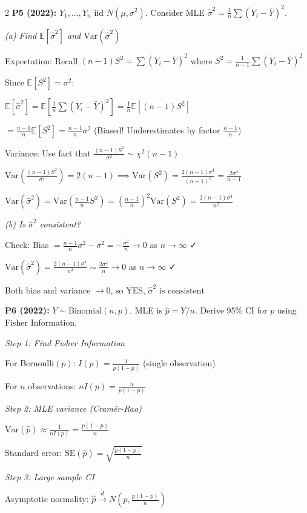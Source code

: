 \documentclass[10pt,letterpaper]{article}
\newcommand{\Var}{\text{Var}}
\newcommand{\E}{\mathbb{E}}
\begin{document}
\begin{multicols}{2}
\textbf{P5 (2022):} $Y_1, \ldots, Y_n$ iid $N(\mu, \sigma^2)$. Consider MLE $\hat{\sigma}^2 = \frac{1}{n}\sum(Y_i-\bar{Y})^2$.

\textit{(a) Find $\E[\hat{\sigma}^2]$ and $\Var(\hat{\sigma}^2)$}

Expectation: Recall $(n-1)S^2 = \sum(Y_i-\bar{Y})^2$ where $S^2 = \frac{1}{n-1}\sum(Y_i-\bar{Y})^2$

Since $\E[S^2] = \sigma^2$:

$\E[\hat{\sigma}^2] = \E\left[\frac{1}{n}\sum(Y_i-\bar{Y})^2\right] = \frac{1}{n}\E[(n-1)S^2]$

$= \frac{n-1}{n}\E[S^2] = \boxed{\frac{n-1}{n}\sigma^2}$ (Biased! Underestimates by factor $\frac{n-1}{n}$)

Variance: Use fact that $\frac{(n-1)S^2}{\sigma^2} \sim \chi^2(n-1)$

$\Var\left(\frac{(n-1)S^2}{\sigma^2}\right) = 2(n-1) \implies \Var(S^2) = \frac{2(n-1)\sigma^4}{(n-1)^2} = \frac{2\sigma^4}{n-1}$

$\Var(\hat{\sigma}^2) = \Var\left(\frac{n-1}{n}S^2\right) = \left(\frac{n-1}{n}\right)^2 \Var(S^2) = \boxed{\frac{2(n-1)\sigma^4}{n^2}}$

\textit{(b) Is $\hat{\sigma}^2$ consistent?}

Check: Bias $= \frac{n-1}{n}\sigma^2 - \sigma^2 = -\frac{\sigma^2}{n} \to 0$ as $n \to \infty$ ✓

$\Var(\hat{\sigma}^2) = \frac{2(n-1)\sigma^4}{n^2} \sim \frac{2\sigma^4}{n} \to 0$ as $n \to \infty$ ✓

Both bias and variance $\to 0$, so $\boxed{\text{YES, } \hat{\sigma}^2 \text{ is consistent}}$

\textbf{P6 (2022):} $Y \sim \text{Binomial}(n, p)$. MLE is $\hat{p} = Y/n$. Derive 95\% CI for $p$ using Fisher Information.

\textit{Step 1: Find Fisher Information}

For Bernoulli$(p)$: $I(p) = \frac{1}{p(1-p)}$ (single observation)

For $n$ observations: $nI(p) = \frac{n}{p(1-p)}$

\textit{Step 2: MLE variance (Cramér-Rao)}

$\Var(\hat{p}) \approx \frac{1}{nI(p)} = \frac{p(1-p)}{n}$

Standard error: $\text{SE}(\hat{p}) = \sqrt{\frac{p(1-p)}{n}}$

\textit{Step 3: Large sample CI}

Asymptotic normality: $\hat{p} \xrightarrow{d} N\left(p, \frac{p(1-p)}{n}\right)$


\end{multicols}
\end{document}
